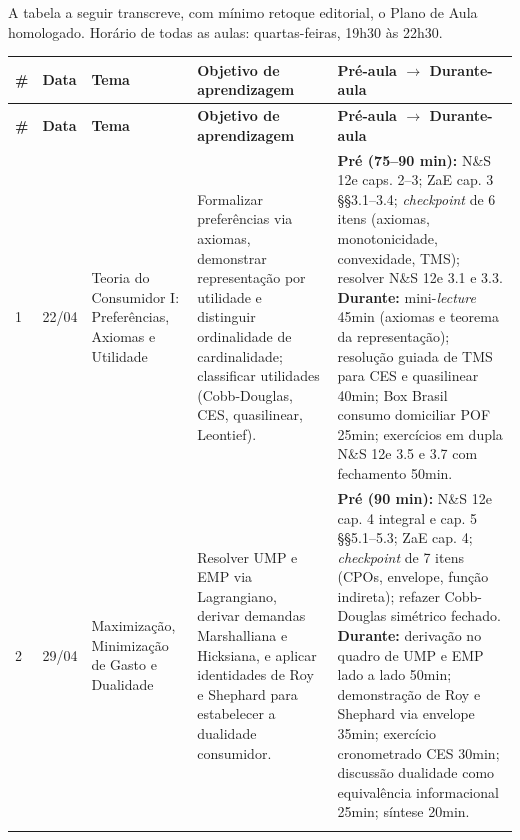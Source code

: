 \documentclass[11pt,a4paper]{article}
\newcommand{\zaeshort}{ZaE}
\newcommand{\ns}{N\&S 12e}
\begin{document}
A tabela a seguir transcreve, com mínimo retoque editorial, o Plano de Aula homologado. Horário de todas as aulas: quartas-feiras, 19h30 às 22h30.

\begin{small}
\begin{longtable}{@{}p{0.9cm}p{1.6cm}p{2.8cm}p{4.2cm}p{4.6cm}@{}}
\toprule
\textbf{\#} & \textbf{Data} & \textbf{Tema} & \textbf{Objetivo de aprendizagem} & \textbf{Pré-aula $\to$ Durante-aula} \\
\midrule
\endfirsthead

\toprule
\textbf{\#} & \textbf{Data} & \textbf{Tema} & \textbf{Objetivo de aprendizagem} & \textbf{Pré-aula $\to$ Durante-aula} \\
\midrule
\endhead

\bottomrule
\endfoot

1 & 22/04 & Teoria do Consumidor I: Preferências, Axiomas e Utilidade & Formalizar preferências via axiomas, demonstrar representação por utilidade e distinguir ordinalidade de cardinalidade; classificar utilidades (Cobb-Douglas, CES, quasilinear, Leontief). &
\textbf{Pré (75--90 min):} \ns{} caps. 2--3; \zaeshort{} cap. 3 §§3.1--3.4; \textit{checkpoint} de 6 itens (axiomas, monotonicidade, convexidade, TMS); resolver \ns{} 3.1 e 3.3.\newline
\textbf{Durante:} mini-\textit{lecture} 45min (axiomas e teorema da representação); resolução guiada de TMS para CES e quasilinear 40min; Box Brasil consumo domiciliar POF 25min; exercícios em dupla \ns{} 3.5 e 3.7 com fechamento 50min. \\
\addlinespace

2 & 29/04 & Maximização, Minimização de Gasto e Dualidade & Resolver UMP e EMP via Lagrangiano, derivar demandas Marshalliana e Hicksiana, e aplicar identidades de Roy e Shephard para estabelecer a dualidade consumidor. &
\textbf{Pré (90 min):} \ns{} cap. 4 integral e cap. 5 §§5.1--5.3; \zaeshort{} cap. 4; \textit{checkpoint} de 7 itens (CPOs, envelope, função indireta); refazer Cobb-Douglas simétrico fechado.\newline
\textbf{Durante:} derivação no quadro de UMP e EMP lado a lado 50min; demonstração de Roy e Shephard via envelope 35min; exercício cronometrado CES 30min; discussão dualidade como equivalência informacional 25min; síntese 20min. \\
\addlinespace


\end{longtable}
\end{small}
\end{document}
